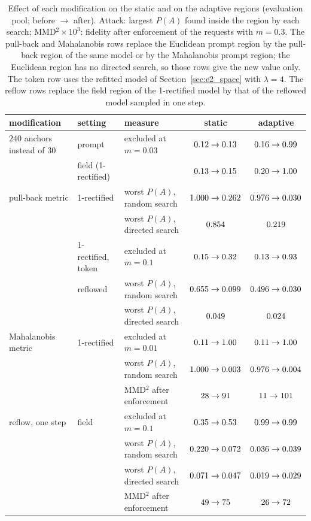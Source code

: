 \documentclass{article}
\theoremstyle{plain}
\theoremstyle{remark}
\begin{document}
\begin{table}[!htbp]
\centering
\caption{Effect of each modification on the static and on the adaptive regions (evaluation pool; before $\to$ after). Attack: largest
$P(A)$ found inside the region by each search; MMD$^2\times10^3$: fidelity after enforcement of the requests with $m=0.3$. The pull-back
and Mahalanobis rows replace the Euclidean prompt region by the pull-back region of the same model or by the Mahalanobis prompt
region; the Euclidean region has no directed search, so those rows give the new value only. The token row uses the refitted model
of Section~\ref{sec:e2_space} with $\lambda=4$. The reflow rows replace the field region of the 1-rectified model by that of the
reflowed model sampled in one step.}
\label{tab:e2_repairs}
\small
\begin{tabular}{l l l c c}
\toprule
modification & setting & measure & static & adaptive\\
\midrule
$240$ anchors instead of $30$ & prompt & excluded at $m=0.03$ & $0.12\to0.13$ & $0.16\to0.99$\\
& field (1-rectified) & & $0.13\to0.15$ & $0.20\to1.00$\\
\midrule
pull-back metric & 1-rectified & worst $P(A)$, random search & $1.000\to0.262$ & $0.976\to0.030$\\
& & worst $P(A)$, directed search & $0.854$ & $0.219$\\
& 1-rectified, token & excluded at $m=0.1$ & $0.15\to0.32$ & $0.13\to0.93$\\
& reflowed & worst $P(A)$, random search & $0.655\to0.099$ & $0.496\to0.030$\\
& & worst $P(A)$, directed search & $0.049$ & $0.024$\\
\midrule
Mahalanobis metric & 1-rectified & excluded at $m=0.01$ & $0.11\to1.00$ & $0.11\to1.00$\\
& & worst $P(A)$, random search & $1.000\to0.003$ & $0.976\to0.004$\\
& & MMD$^2$ after enforcement & $28\to91$ & $11\to101$\\
\midrule
reflow, one step & field & excluded at $m=0.1$ & $0.35\to0.53$ & $0.99\to0.99$\\
& & worst $P(A)$, random search & $0.220\to0.072$ & $0.036\to0.039$\\
& & worst $P(A)$, directed search & $0.071\to0.047$ & $0.019\to0.029$\\
& & MMD$^2$ after enforcement & $49\to75$ & $26\to72$\\
\bottomrule
\end{tabular}
\end{table}
\end{document}
